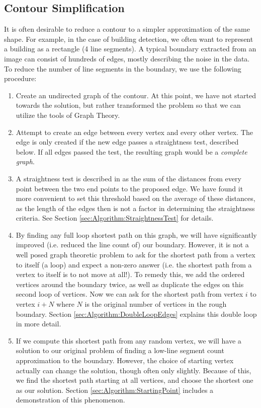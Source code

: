 \documentclass{InsightArticle}
\begin{document}
\subsection{Contour Simplification}
\label{sec:Algorithm:ContourSimplification}
It is often desirable to reduce a contour to a simpler approximation of the same shape. For example, in the case of building detection, we often want to represent a building as a rectangle (4 line segments). A typical boundary extracted from an image can consist of hundreds of edges, mostly describing the noise in the data. To reduce the number of line segments in the boundary, we use the following procedure:
\begin{enumerate}
  \item Create an undirected graph of the contour. At this point, we have not started towards the solution, but rather transformed the problem so that we can utilize the tools of Graph Theory.
 \item Attempt to create an edge between every vertex and every other vertex. The edge is only created if the new edge passes a straightness test, described below. If all edges passed the test, the resulting graph would be a \emph{complete graph}.
 \item A straightness test is described in \cite{WangThesis} as the sum of the distances from every point between the two end points to the proposed edge. We have found it more convenient to set this threshold based on the average of these distances, as the length of the edges then is not a factor in determining the straightness criteria. See Section \ref{sec:Algorithm:StraightnessTest} for details.
 \item By finding any full loop shortest path on this graph, we will have significantly improved (i.e. reduced the line count of) our boundary. However, it is not a well posed graph theoretic problem to ask for the shortest path from a vertex to itself (a loop) and expect a non-zero answer (i.e. the shortest path from a vertex to itself is to not move at all!). To remedy this, we add the ordered vertices around the boundary twice, as well as duplicate the edges on this second loop of vertices. Now we can ask for the shortest path from vertex $i$ to vertex $i+N$ where $N$ is the original number of vertices in the rough boundary. Section \ref{sec:Algorithm:DoubleLoopEdges} explains this double loop in more detail.
 \item If we compute this shortest path from any random vertex, we will have a solution to our original problem of finding a low-line segment count approximation to the boundary. However, the choice of starting vertex actually can change the solution, though often only slightly. Because of this, we find the shortest path starting at all vertices, and choose the shortest one as our solution. Section \ref{sec:Algorithm:StartingPoint} includes a demonstration of this phenomenon.
\end{enumerate}
\end{document}
